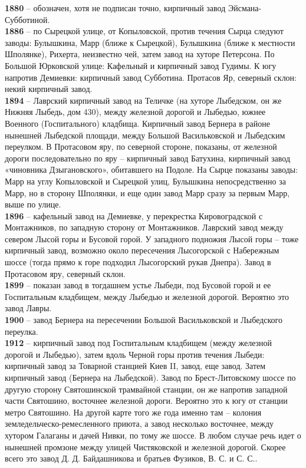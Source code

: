 \noindent\textbf{1880} – обозначен, хотя не подписан точно, кирпичный завод Эйсмана-Субботиной.\\

\noindent\textbf{1886} – по Сырецкой улице, от Копыловской, против течения Сырца следуют заводы: Булышкина, Марр (ближе к Сырецкой), Булышкина (ближе к местности Шполянке), Рихерта, неизвестно чей, затем завод на хуторе Петерсона. По Большой Юрковской улице: Кафельный и кирпичный завод Гудимы. К югу напротив Демиевки: кирпичный завод Субботина. Протасов Яр, северный склон: некий кирпичный завод.\\

\noindent\textbf{1894} – Лаврский кирпичный завод на Теличке (на хуторе Лыбедском, он же Нижняя Лыбедь, дом 430), между железной дорогой и Лыбедью, южнее Военного (Госпитального) кладбища. Кирпичный завод Бернера в районе нынешней Лыбедской площади, между Большой Васильковской и Лыбедским переулком. В Протасовом яру, по северной стороне, показаны, от железной дороги последовательно по яру – кирпичный завод Батухина, кирпичный завод «чиновника Дзыгановского», обитавшего на Подоле. На Сырце показаны заводы: Марр на углу Копыловской и Сырецкой улиц, Булышкина непосредственно за Марр, но в сторону Шполянки, и еще один завод Марр сразу за первым Марр, выше по улице.\\

\noindent\textbf{1896} – кафельный завод на Демиевке, у перекрестка Кировоградской с Монтажников, по западную сторону от Монтажников. Лаврский завод между севером Лысой горы и Бусовой горой. У западного подножия Лысой горы – тоже кирпичный завод, возможно около пересечения Лысогорской с Набережным шоссе (тогда прямо к горе подходил Лысогорский рукав Днепра). Завод в Протасовом яру, северный склон.\\

\noindent\textbf{1899} – показан завод в тогдашнем устье Лыбеди, под Бусовой горой и ее Госпитальным кладбищем, между Лыбедью и железной дорогой. Вероятно это завод Лавры.\\

\noindent\textbf{1900} – завод Бернера на пересечении Большой Васильковской и Лыбедского переулка.\\

\noindent\textbf{1912} – кирпичный завод под Госпитальным кладбищем (между железной дорогой и Лыбедью), затем вдоль Черной горы против течения Лыбеди: кирпичный завод за Товарной станцией Киев II, завод, еще завод. Затем кирпичный завод (Бернера на Лыбедской). Завод по Брест-Литовскому шоссе по другую сторону Святошинской трамвайной станции, он же напротив западной части Святошино, восточнее железной дороги. Вероятно это к югу от станции метро Святошино. На другой карте того же года именно там – колония земледельческо-ремесленного приюта, а завод несколько восточнее, между хутором Галаганы и дачей Нивки, по тому же шоссе. В любом случае речь идет о нынешней промзоне между улицей Чистяковской и железной дорогой. Скорее всего это завод Д. Д. Байдашникова и братьев Фузиков, В. С. и С. С..\\

